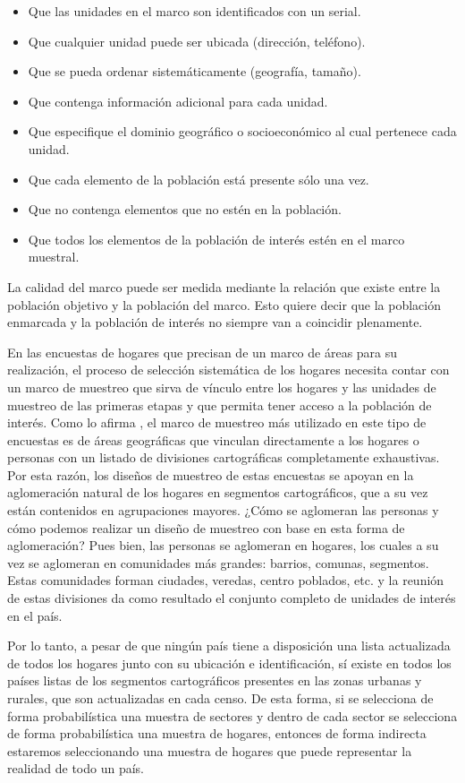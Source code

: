 \documentclass[
  12pt,
  spanish,
]{book}
\providecommand{\tightlist}{%
  \setlength{\itemsep}{0pt}\setlength{\parskip}{0pt}}
\begin{document}
\begin{itemize}
\tightlist
\item
  Que las unidades en el marco son identificados con un serial.
\item
  Que cualquier unidad puede ser ubicada (dirección, teléfono).
\item
  Que se pueda ordenar sistemáticamente (geografía, tamaño).
\item
  Que contenga información adicional para cada unidad.
\item
  Que especifique el dominio geográfico o socioeconómico al cual pertenece cada unidad.
\item
  Que cada elemento de la población está presente sólo una vez.
\item
  Que no contenga elementos que no estén en la población.
\item
  Que todos los elementos de la población de interés estén en el marco muestral.
\end{itemize}

La calidad del marco puede ser medida mediante la relación que existe entre la población objetivo y la población del marco. Esto quiere decir que la población enmarcada y la población de interés no siempre van a coincidir plenamente.

En las encuestas de hogares que precisan de un marco de áreas para su realización, el proceso de selección sistemática de los hogares necesita contar con un marco de muestreo que sirva de vínculo entre los hogares y las unidades de muestreo de las primeras etapas y que permita tener acceso a la población de interés. Como lo afirma \citet{Gutierrez_2016}, el marco de muestreo más utilizado en este tipo de encuestas es de áreas geográficas que vinculan directamente a los hogares o personas con un listado de divisiones cartográficas completamente exhaustivas. Por esta razón, los diseños de muestreo de estas encuestas se apoyan en la aglomeración natural de los hogares en segmentos cartográficos, que a su vez están contenidos en agrupaciones mayores. ¿Cómo se aglomeran las personas y cómo podemos realizar un diseño de muestreo con base en esta forma de aglomeración? Pues bien, las personas se aglomeran en hogares, los cuales a su vez se aglomeran en comunidades más grandes: barrios, comunas, segmentos. Estas comunidades forman ciudades, veredas, centro poblados, etc. y la reunión de estas divisiones da como resultado el conjunto completo de unidades de interés en el país.

Por lo tanto, a pesar de que ningún país tiene a disposición una lista actualizada de todos los hogares junto con su ubicación e identificación, sí existe en todos los países listas de los segmentos cartográficos presentes en las zonas urbanas y rurales, que son actualizadas en cada censo. De esta forma, si se selecciona de forma probabilística una muestra de sectores y dentro de cada sector se selecciona de forma probabilística una muestra de hogares, entonces de forma indirecta estaremos seleccionando una muestra de hogares que puede representar la realidad de todo un país.
\end{document}
